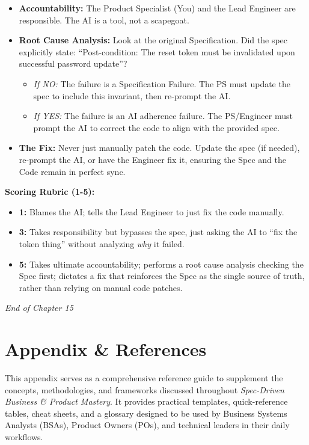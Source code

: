 \documentclass[
  11pt,
  openany,
  oneside]{book}
\providecommand{\tightlist}{%
  \setlength{\itemsep}{0pt}\setlength{\parskip}{0pt}}
\begin{document}
\begin{itemize}
\tightlist
\item
  \textbf{Accountability:} The Product Specialist (You) and the Lead
  Engineer are responsible. The AI is a tool, not a scapegoat.
\item
  \textbf{Root Cause Analysis:} Look at the original Specification. Did
  the spec explicitly state: ``Post-condition: The reset token must be
  invalidated upon successful password update''?

  \begin{itemize}
  \tightlist
  \item
    \emph{If NO:} The failure is a Specification Failure. The PS must
    update the spec to include this invariant, then re-prompt the AI.
  \item
    \emph{If YES:} The failure is an AI adherence failure. The
    PS/Engineer must prompt the AI to correct the code to align with the
    provided spec.
  \end{itemize}
\item
  \textbf{The Fix:} Never just manually patch the code. Update the spec
  (if needed), re-prompt the AI, or have the Engineer fix it, ensuring
  the Spec and the Code remain in perfect sync.
\end{itemize}

\textbf{Scoring Rubric (1-5):}

\begin{itemize}
\tightlist
\item
  \textbf{1:} Blames the AI; tells the Lead Engineer to just fix the
  code manually.
\item
  \textbf{3:} Takes responsibility but bypasses the spec, just asking
  the AI to ``fix the token thing'' without analyzing \emph{why} it
  failed.
\item
  \textbf{5:} Takes ultimate accountability; performs a root cause
  analysis checking the Spec first; dictates a fix that reinforces the
  Spec as the single source of truth, rather than relying on manual code
  patches.
\end{itemize}

\bigskip

\emph{End of Chapter 15}

\chapter{Appendix \& References}\label{appendix-references}

This appendix serves as a comprehensive reference guide to supplement
the concepts, methodologies, and frameworks discussed throughout
\emph{Spec-Driven Business \& Product Mastery}. It provides practical
templates, quick-reference tables, cheat sheets, and a glossary designed
to be used by Business Systems Analysts (BSAs), Product Owners (POs),
and technical leaders in their daily workflows.
\end{document}
